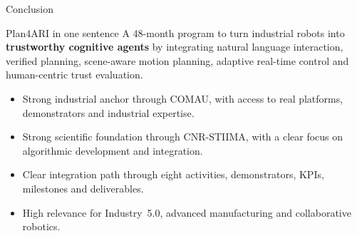 \documentclass[aspectratio=169,10pt]{beamer}
\begin{document}
\begin{frame}{Conclusion}

\begin{block}{Plan4ARI in one sentence}
A 48-month program to turn industrial robots into \textbf{trustworthy cognitive agents} by integrating natural language interaction, verified planning, scene-aware motion planning, adaptive real-time control and human-centric trust evaluation.
\end{block}
\begin{itemize}
  \item Strong industrial anchor through COMAU, with access to real platforms, demonstrators and industrial expertise.
  \item Strong scientific foundation through CNR-STIIMA, with a clear focus on algorithmic development and integration.
  \item Clear integration path through eight activities, demonstrators, KPIs, milestones and deliverables.
  \item High relevance for Industry~5.0, advanced manufacturing and collaborative robotics.
\end{itemize}

\end{frame}
\end{document}
